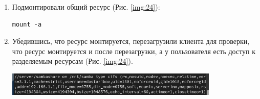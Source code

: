 \begin{enumerate}
\begin{enumerate}
\item Подмонтировали общий ресурс (Рис. \ref{img:24}):
    \begin{verbatim}
mount -a
    \end{verbatim}
\item Убедившись, что ресурс монтируется, перезагрузили клиента для проверки, что ресурс монтируется и после перезагрузки, а у пользователя есть доступ к разделяемым ресурсам (Рис. \ref{img:24}).

\begin{center}
    \centering
    \includegraphics[width=0.8\textwidth]{../images/image24.png}
    \label{img:24}
\end{center}

    \end{enumerate}
\end{enumerate}

